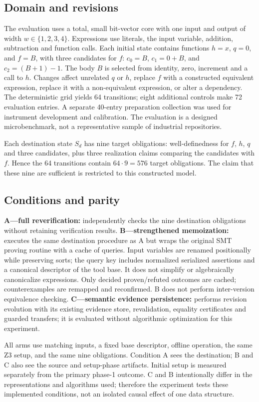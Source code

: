 \documentclass[10pt,twocolumn]{article}
\begin{document}
\subsection{Domain and revisions}
The evaluation uses a total, small bit-vector core with one input and output of width $w\in\{1,2,3,4\}$. Expressions use literals, the input variable, addition, subtraction and function calls. Each initial state contains functions $h=x$, $q=0$, and $f=B$, with three candidates for $f$: $c_0=B$, $c_1=0+B$, and $c_2=(B+1)-1$. The body $B$ is selected from identity, zero, increment and a call to $h$. Changes affect unrelated $q$ or $h$, replace $f$ with a constructed equivalent expression, replace it with a non-equivalent expression, or alter a dependency. The deterministic grid yields 64 transitions; eight additional controls make 72 evaluation entries. A separate 40-entry preparation collection was used for instrument development and calibration. The evaluation is a designed microbenchmark, not a representative sample of industrial repositories.

Each destination state $S_d$ has nine target obligations: well-definedness for $f$, $h$, $q$ and three candidates, plus three realization claims comparing the candidates with $f$. Hence the 64 transitions contain $64\cdot9=576$ target obligations. The claim that these nine are sufficient is restricted to this constructed model.

\subsection{Conditions and parity}
\textbf{A---full reverification:} independently checks the nine destination obligations without retaining verification results. \textbf{B---strengthened memoization:} executes the same destination procedure as A but wraps the original SMT proving routine with a cache of queries. Input variables are renamed positionally while preserving sorts; the query key includes normalized serialized assertions and a canonical descriptor of the tool base. It does not simplify or algebraically canonicalize expressions. Only decided proven/refuted outcomes are cached; counterexamples are remapped and reconfirmed. B does not perform inter-version equivalence checking. \textbf{C---semantic evidence persistence:} performs revision evolution with its existing evidence store, revalidation, equality certificates and guarded transfers; it is evaluated without algorithmic optimization for this experiment.

All arms use matching inputs, a fixed base descriptor, offline operation, the same Z3 setup, and the same nine obligations. Condition A sees the destination; B and C also see the source and setup-phase artifacts. Initial setup is measured separately from the primary phase-1 outcome. C and B intentionally differ in the representations and algorithms used; therefore the experiment tests these implemented conditions, not an isolated causal effect of one data structure.
\end{document}
